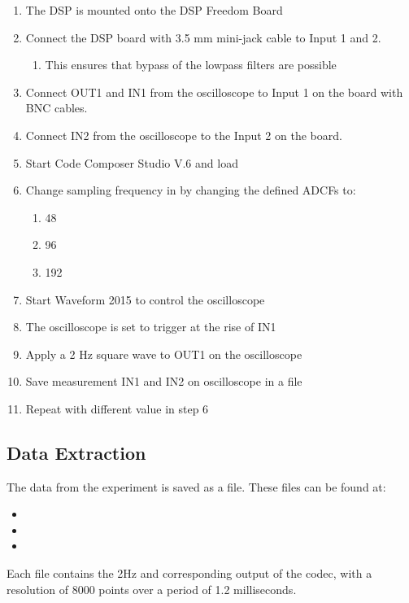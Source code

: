 \begin{enumerate}
	\item The DSP is mounted onto the DSP Freedom Board
	\item  Connect the DSP board with 3.5 mm mini-jack cable to Input 1 and 2.
	\begin{enumerate}
		\item This ensures that bypass of the lowpass filters are possible
	\end{enumerate}
	\item Connect OUT1 and IN1 from the oscilloscope to Input 1 on the board with BNC cables.
	\item Connect IN2 from the oscilloscope to the Input 2 on the board.
	\item Start Code Composer Studio V.6 and load 
	\item Change sampling frequency in  by changing the defined ADCFs to:
	\begin{enumerate}
		\item 48
		\item 96
		\item 192
	\end{enumerate}
	\item Start Waveform 2015 to control the oscilloscope
	\item The oscilloscope is set to trigger at the rise of IN1
	\item Apply a 2 Hz square wave to OUT1 on the oscilloscope
	\item Save measurement IN1 and IN2 on oscilloscope in a  file
	\item Repeat with different value in step 6
\end{enumerate}


\subsection{Data Extraction}

The data from the experiment is saved as a  file. These files can be found at:
\begin{itemize}
	\item {}
	\item {}
	\item {}
\end{itemize}

Each file contains the 2Hz and corresponding output of the codec, with a resolution of 8000 points over a period of 1.2 milliseconds.


